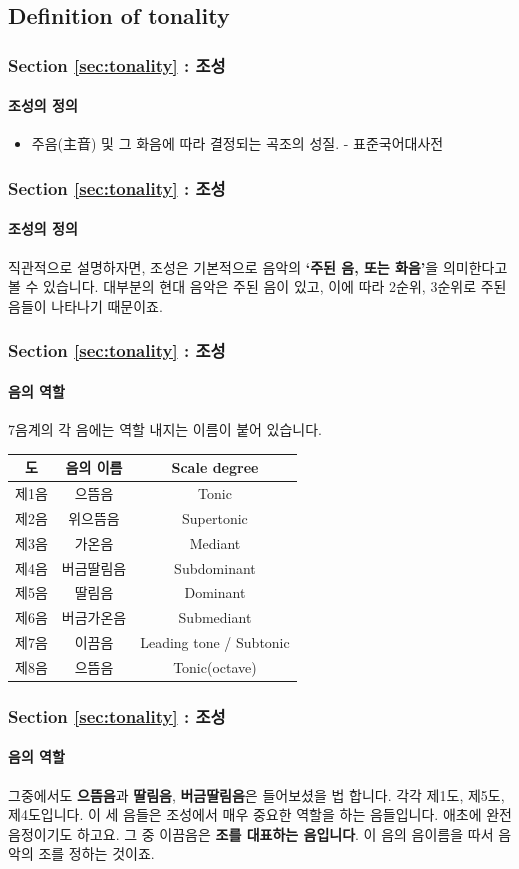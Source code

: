 \documentclass{beamer}
\begin{document}
	\subsection{Definition of tonality}
	\begin{frame}
		\frametitle{Section \ref{sec:tonality} : 조성}
		\framesubtitle{조성의 정의}
		\begin{definition}[조성, 調性, Tonality]
			\begin{itemize}
				\item 주음(主音) 및 그 화음에 따라 결정되는 곡조의 성질. - 표준국어대사전
			\end{itemize}
		\end{definition}
	\end{frame}
	
	\begin{frame}
		\frametitle{Section \ref{sec:tonality} : 조성}
		\framesubtitle{조성의 정의}
		직관적으로 설명하자면, 조성은 기본적으로 음악의 {\bf `주된 음, 또는 화음'}을 의미한다고 볼 수 있습니다. 대부분의 현대 음악은 주된 음이 있고, 이에 따라 2순위, 3순위로 주된 음들이 나타나기 때문이죠.
	\end{frame}
	
	\begin{frame}
		\frametitle{Section \ref{sec:tonality} : 조성}
		\framesubtitle{음의 역할}
		7음계의 각 음에는 역할 내지는 이름이 붙어 있습니다.
		\begin{table}[!h]
			\centering
			\begin{tabular}{|c|c|c|}
				\hline
				도 & 음의 이름 & Scale degree \\ \hline
				제1음 & 으뜸음 & Tonic \\ \hline
				제2음 & 위으뜸음 & Supertonic \\ \hline
				제3음 & 가온음 & Mediant \\ \hline
				제4음 & 버금딸림음 & Subdominant \\ \hline
				제5음 & 딸림음 & Dominant \\ \hline
				제6음 & 버금가온음 & Submediant \\ \hline
				제7음 & 이끔음 & Leading tone / Subtonic \\ \hline
				제8음 & 으뜸음 & Tonic(octave) \\ \hline
			\end{tabular}
		\end{table}
	\end{frame}
	
	\begin{frame}
		\frametitle{Section \ref{sec:tonality} : 조성}
		\framesubtitle{음의 역할}
		그중에서도 {\bf 으뜸음}과 {\bf 딸림음}, {\bf 버금딸림음}은 들어보셨을 법 합니다. 각각 제1도, 제5도, 제4도입니다. 이 세 음들은 조성에서 매우 중요한 역할을 하는 음들입니다. 애초에 완전음정이기도 하고요. 그 중 이끔음은 {\bf 조를 대표하는 음입니다}. 이 음의 음이름을 따서 음악의 조를 정하는 것이죠.
	\end{frame}
	
\end{document}
